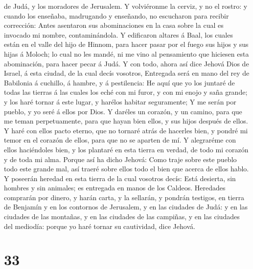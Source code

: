 de Judá, y los moradores de Jerusalem.  Y volviéronme la
cerviz, y no el rostro: y cuando los enseñaba, madrugando y enseñando,
no escucharon para recibir corrección:  Antes asentaron
sus abominaciones en la casa sobre la cual es invocado mi nombre,
contaminándola.  Y edificaron altares á Baal, los cuales
están en el valle del hijo de Hinnom, para hacer pasar por el fuego sus
hijos y sus hijas á Moloch; lo cual no les mandé, ni me vino al
pensamiento que hiciesen esta abominación, para hacer pecar á Judá.
 Y con todo, ahora así dice Jehová Dios de Israel, á esta
ciudad, de la cual decís vosotros, Entregada será en mano del rey de
Babilonia á cuchillo, á hambre, y á pestilencia:  He aquí
que yo los juntaré de todas las tierras á las cuales los eché con mi
furor, y con mi enojo y saña grande; y los haré tornar á este lugar, y
harélos habitar seguramente;  Y me serán por pueblo, y yo
seré á ellos por Dios.  Y daréles un corazón, y un
camino, para que me teman perpetuamente, para que hayan bien ellos, y
sus hijos después de ellos.  Y haré con ellos pacto
eterno, que no tornaré atrás de hacerles bien, y pondré mi temor en el
corazón de ellos, para que no se aparten de mí.  Y
alegraréme con ellos haciéndoles bien, y los plantaré en esta tierra en
verdad, de todo mi corazón y de toda mi alma.  Porque así
ha dicho Jehová: Como traje sobre este pueblo todo este grande mal, así
traeré sobre ellos todo el bien que acerca de ellos hablo.
 Y poseerán heredad en esta tierra de la cual vosotros
decís: Está desierta, sin hombres y sin animales; es entregada en manos
de los Caldeos.  Heredades comprarán por dinero, y harán
carta, y la sellarán, y pondrán testigos, en tierra de Benjamín y en los
contornos de Jerusalem, y en las ciudades de Judá: y en las ciudades de
las montañas, y en las ciudades de las campiñas, y en las ciudades del
mediodía: porque yo haré tornar su cautividad, dice Jehová.

\hypertarget{section-32}{%
\section{33}\label{section-32}}

